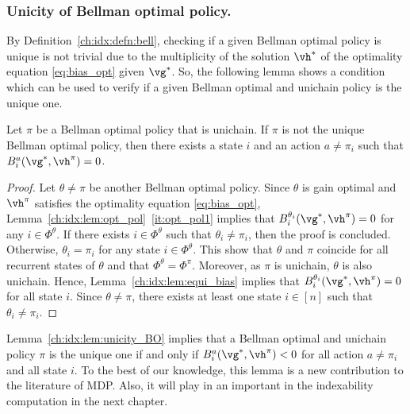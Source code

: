 \subsubsection{Unicity of Bellman optimal policy.}
\label{ch:idx:sssec:unicity}

By Definition~\ref{ch:idx:defn:bell}, checking if a given Bellman optimal policy is unique is not trivial due to the multiplicity of the solution $\vh^*$ of the optimality equation \eqref{eq:bias_opt} given $\vg^*$.
So, the following lemma shows a condition which can be used to verify if a given Bellman optimal and unichain policy is the unique one.
\begin{lem}
    \label{ch:idx:lem:unicity_BO}
    Let $\pi$ be a Bellman optimal policy that is unichain. If $\pi$ is not the unique Bellman optimal policy, then there exists a state $i$ and an action $a\neq\pi_i$ such that $B_i^a(\vg^*,\vh^\pi)=0$.
\end{lem}

\begin{proof}
    Let $\theta\neq\pi$ be another Bellman optimal policy.
    Since $\theta$ is gain optimal and $\vh^\pi$ satisfies the optimality equation \eqref{eq:bias_opt}, Lemma~\ref{ch:idx:lem:opt_pol}~\ref{it:opt_pol1} implies that $B_i^{\theta_i}(\vg^*,\vh^\pi) =0$ for any $i\in\Phi^\theta$.
    If there exists $i\in\Phi^\theta$ such that $\theta_i\neq\pi_i$, then the proof is concluded.
    Otherwise, $\theta_i=\pi_i$ for any state $i\in\Phi^\theta$.
    This show that $\theta$ and $\pi$ coincide for all recurrent states of $\theta$ and that $\Phi^\theta=\Phi^\pi$.
    Moreover, as $\pi$ is unichain, $\theta$ is also unichain.
    Hence, Lemma~\ref{ch:idx:lem:equi_bias} implies that $B_i^{\theta_i}(\vg^*, \vh^\pi)=0$ for all state $i$.
    Since $\theta\neq\pi$, there exists at least one state $i\in[n]$ such that $\theta_i\neq\pi_i$.
\end{proof}
Lemma~\ref{ch:idx:lem:unicity_BO} implies that a Bellman optimal and unichain policy $\pi$ is the unique one if and only if $B_i^a(\vg^*, \vh^\pi)<0$ for all action $a\neq\pi_i$ and all state $i$.
To the best of our knowledge, this lemma is a new contribution to the literature of MDP.
Also, it will play in an important in the indexability computation in the next chapter.

